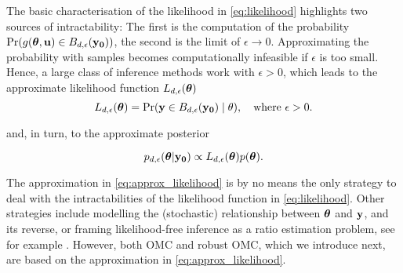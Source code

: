 The basic characterisation of the likelihood in \eqref{eq:likelihood}
highlights two sources of intractability: The first is the computation
of the probability
\(\Pr(g(\boldsymbol{\theta},\mathbf{u}) \in B_{d,\epsilon}(\mathbf{y_0}))\), the second is the
limit of \(\epsilon \to 0\).  Approximating the probability with
samples becomes computationally infeasible if \(\epsilon\) is too
small. Hence, a large class of inference methods work with
\(\epsilon > 0\), which leads to the approximate likelihood function
\(L_{d, \epsilon}(\boldsymbol{\theta})\)
\begin{equation} \label{eq:approx_likelihood}
  L_{d, \epsilon}(\boldsymbol{\theta}) = \Pr(\mathbf{y} \in B_{d,\epsilon}(\mathbf{y_0}) \mid \theta), \quad \text{where  } \epsilon > 0.
\end{equation}

and, in turn, to the approximate posterior

\begin{equation} \label{eq:approx_posterior}
  p_{d,\epsilon}(\boldsymbol{\theta}|\mathbf{y_0}) \propto L_{d, \epsilon}(\boldsymbol{\theta}) p(\boldsymbol{\theta}).
\end{equation}

The approximation in \eqref{eq:approx_likelihood} is by no means the
only strategy to deal with the intractabilities of the likelihood
function in \eqref{eq:likelihood}. Other strategies include modelling
the (stochastic) relationship between \(\boldsymbol{\theta}\) and \(\mathbf{y}\), and its
reverse, or framing likelihood-free inference as a ratio estimation
problem, see for example \citet{Blum2010, Wood2010, Papamakarios2016,
  Papamakarios2019, Chen2019, Thomas2020, Hermans2020}. However, both
OMC and robust OMC, which we introduce next, are based on the
approximation in \eqref{eq:approx_likelihood}.

